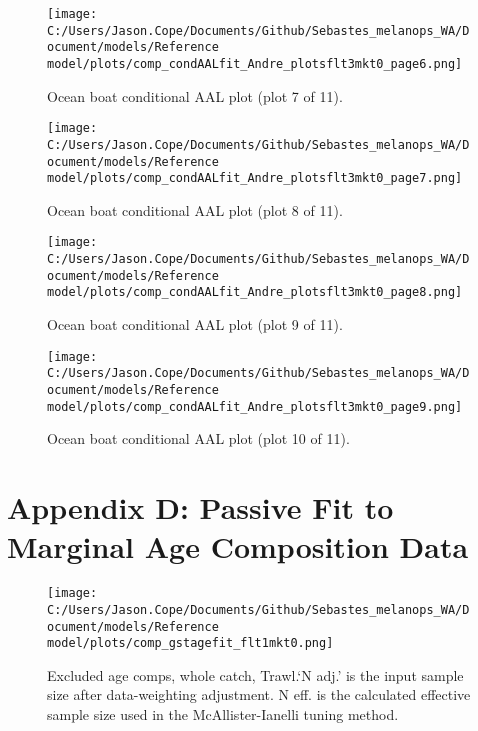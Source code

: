 \documentclass[11pt,
  english,
  letterpaper,
]{article}
\begin{document}
\begin{figure}
\centering
\texttt{[image: C:/Users/Jason.Cope/Documents/Github/Sebastes\_melanops\_WA/Document/models/Reference model/plots/comp\_condAALfit\_Andre\_plotsflt3mkt0\_page6.png]}
\caption{Ocean boat conditional AAL plot (plot 7 of 11).\label{fig:comp_condAALfit_Andre_plotsflt3mkt0_page6}}
\end{figure}

\begin{figure}
\centering
\texttt{[image: C:/Users/Jason.Cope/Documents/Github/Sebastes\_melanops\_WA/Document/models/Reference model/plots/comp\_condAALfit\_Andre\_plotsflt3mkt0\_page7.png]}
\caption{Ocean boat conditional AAL plot (plot 8 of 11).\label{fig:comp_condAALfit_Andre_plotsflt3mkt0_page7}}
\end{figure}

\begin{figure}
\centering
\texttt{[image: C:/Users/Jason.Cope/Documents/Github/Sebastes\_melanops\_WA/Document/models/Reference model/plots/comp\_condAALfit\_Andre\_plotsflt3mkt0\_page8.png]}
\caption{Ocean boat conditional AAL plot (plot 9 of 11).\label{fig:comp_condAALfit_Andre_plotsflt3mkt0_page8}}
\end{figure}

\begin{figure}
\centering
\texttt{[image: C:/Users/Jason.Cope/Documents/Github/Sebastes\_melanops\_WA/Document/models/Reference model/plots/comp\_condAALfit\_Andre\_plotsflt3mkt0\_page9.png]}
\caption{Ocean boat conditional AAL plot (plot 10 of 11).\label{fig:comp_condAALfit_Andre_plotsflt3mkt0_page9}}
\end{figure}

\clearpage

\hypertarget{app-d}{%
\section{Appendix D: Passive Fit to Marginal Age Composition Data}\label{app-d}}

\begin{figure}
\centering
\texttt{[image: C:/Users/Jason.Cope/Documents/Github/Sebastes\_melanops\_WA/Document/models/Reference model/plots/comp\_gstagefit\_flt1mkt0.png]}
\caption{Excluded age comps, whole catch, Trawl.`N adj.' is the input sample size after data-weighting adjustment. N eff. is the calculated effective sample size used in the McAllister-Ianelli tuning method.\label{fig:comp_gstagefit_flt1mkt0}}
\end{figure}
\end{document}
